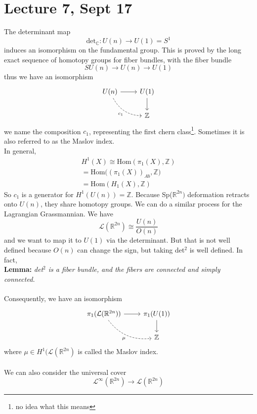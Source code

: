 \documentclass[12pt]{report}
\theoremstyle{definition}
\theoremstyle{remark}
\numberwithin{equation}{section}
\theoremstyle{definition}
\newcommand{\bb}[1]{\mathbb{#1}}
\begin{document}
\section*{Lecture 7, Sept 17}
\label{sec:7}
The determinant map 
$$
	\text{det}_\bb C: U(n) \to U(1) = S^1
$$
induces an isomorphism on the fundamental group. This is proved by the long exact sequence of homotopy groups for fiber bundles, with the fiber bundle
$$
	SU(n) \to U(n) \to U(1)
$$
thus we have an isomorphism 
$$
	\begin{tikzcd}
U(n) \arrow[r] \arrow[rd, "c_1"', dashed, bend right] & U(1) \arrow[d] \\
                                                      & \bb Z         
\end{tikzcd}
$$
we name the composition $c_1$, representing the first chern class\footnote{no idea what this means}. Sometimes it is also referred to as the Maslov index. \\
In general, 
\begin{gather*}
	H^1(X) \cong \text{Hom}(\pi_1(X),\bb Z)\\
= \text{Hom}\big((\pi_1(X))_{Ab},\bb Z	\big)\\
= \text{Hom}(H_1(X),\bb Z)
\end{gather*}
So $c_1$ is a generator for $H^1(U(n)) = \bb Z$. Because Sp($\bb R^{2n})$ deformation retracts onto $U(n)$, they share homotopy groups. We can do a similar process for the Lagrangian Grassmannian. We have 
$$
	\mathcal{L}(\bb R^{2n}) \cong \frac{U(n)}{O(n)}
$$
and we want to map it to $U(1)$ via the determinant. But that is not well defined because $O(n)$ can change the sign, but taking det$^2$ is well defined. In fact, \\
\textbf{Lemma: }\textit{det$^2$ is a fiber bundle, and the fibers are connected and simply connected. }\\\\
Consequently, we have an isomorphism 
$$
	\begin{tikzcd}
\pi_1(\mathcal{L}(\bb R^{2n})) \arrow[r] \arrow[rd, "\mu"', dashed, bend right] & \pi_1(U(1)) \arrow[d] \\
                                                                               & \bb Z                
\end{tikzcd}
$$
where $\mu \in H^1(\mathcal{L}(\bb R^{2n})$ is called the Maslov index. \\\\
We can also consider the universal cover
$$
	\mathcal{L}^\infty(\bb R^{2n}) \to \mathcal{L}(\bb R^{2n})
$$
\end{document}
